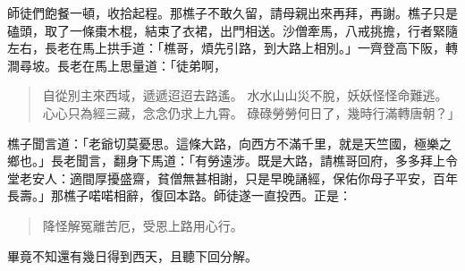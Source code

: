 師徒們飽餐一頓，收拾起程。那樵子不敢久留，請母親出來再拜，再謝。樵子只是磕頭，取了一條棗木棍，結束了衣裙，出門相送。沙僧牽馬，八戒挑擔，行者緊隨左右，長老在馬上拱手道：「樵哥，煩先引路，到大路上相別。」一齊登高下阪，轉澗尋坡。長老在馬上思量道：「徒弟啊，
\begin{quote}
自從別主來西域，遞遞迢迢去路遙。
水水山山災不脫，妖妖怪怪命難逃。
心心只為經三藏，念念仍求上九霄。
碌碌勞勞何日了，幾時行滿轉唐朝？」
\end{quote}

樵子聞言道：「老爺切莫憂思。這條大路，向西方不滿千里，就是天竺國，極樂之鄉也。」長老聞言，翻身下馬道：「有勞遠涉。既是大路，請樵哥回府，多多拜上令堂老安人：適間厚擾盛齋，貧僧無甚相謝，只是早晚誦經，保佑你母子平安，百年長壽。」那樵子喏喏相辭，復回本路。師徒遂一直投西。正是：
\begin{quote}
降怪解冤離苦厄，受恩上路用心行。
\end{quote}

畢竟不知還有幾日得到西天，且聽下回分解。
